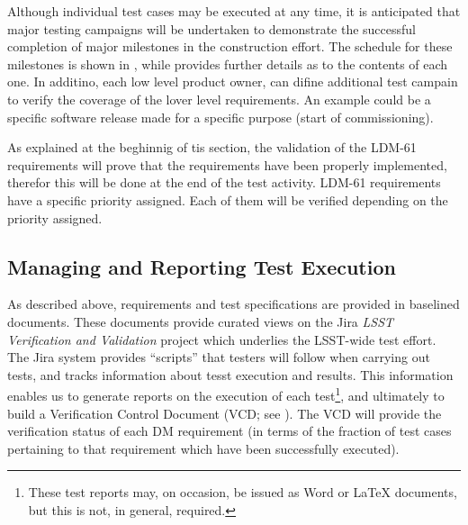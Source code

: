 
Although individual test cases may be executed at any time, it is anticipated that major testing campaigns will be undertaken to demonstrate the successful completion of major milestones in the \product{} construction effort.
The schedule for these milestones is shown in , while  provides further details as to the contents of each one.
In additino, each low level product owner, can difine additional test campain to verify the coverage of the lover level requirements.
An example could be a specific software release made for a specific purpose (start of commissioning).

As explained at the beghinnig of tis section, the validation of the LDM-61 requirements will prove that the \product{} requirements have been properly implemented, therefor this will be done at the end of the test activity.
LDM-61 requirements have a specific priority assigned. Each of them will be verified depending on the priority assigned.

\subsection{Managing and Reporting Test Execution}
\label{sect:reports}

As described above, requirements and test specifications are provided in baselined documents.
These documents provide curated views on the Jira \emph{LSST Verification and Validation} project which underlies the LSST-wide test effort.
The Jira system provides ``scripts'' that testers will follow when carrying out tests, and tracks information about tesst execution and results.
This information enables us to generate reports on the execution of each test\footnote{These test reports may, on occasion, be issued as Word or LaTeX documents, but this is not, in general, required.}, and ultimately to build a Verification Control Document (VCD; see ).
The VCD will provide the verification status of each DM requirement (in terms of the fraction of test cases pertaining to that requirement which have been successfully executed).

